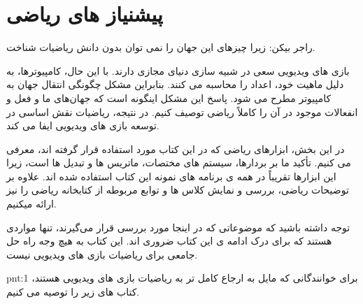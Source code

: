 \newpage

\part{پیشنیاز های ریاضی}
{
    \Large
    \begin{spacing}{1.4}
        \textbf{\vspace{3pt}}
        \begin{displayquote}
            راجر بیکن: زیرا چیزهای این جهان را نمی توان بدون دانش ریاضیات شناخت.
            \begin{flushleft}
            \end{flushleft}
        \end{displayquote}
        \textbf{\vspace{3pt}}

        بازی های ویدیویی سعی در شبیه سازی دنیای مجازی دارند.
        با این حال، کامپیوترها، به دلیل ماهیت خود، اعداد را محاسبه می کنند. بنابراین مشکل چگونگی انتقال جهان به کامپیوتر مطرح می شود.
        پاسخ این مشکل اینگونه است که جهان‌های ما و فعل و انفعالات موجود در آن را کاملاً ریاضی توصیف کنیم.
        در نتیجه، ریاضیات نقش اساسی در توسعه بازی های ویدیویی ایفا می کند.

        در این بخش، ابزارهای ریاضی که در این کتاب مورد استفاده قرار گرفته اند، معرفی می کنیم. تأکید ما بر بردارها، سیستم های مختصات، ماتریس ها و تبدیل ها است، زیرا این ابزارها تقریباً در همه ی برنامه های نمونه این کتاب استفاده شده اند.
        علاوه بر توضیحات ریاضی، بررسی و نمایش کلاس ها و توابع مربوطه از کتابخانه ریاضی  را نیز ارائه میکنیم.

        توجه داشته باشید که موضوعاتی که در اینجا مورد بررسی قرار می‌گیرند، تنها مواردی هستند که برای درک ادامه ی این کتاب ضروری اند.
        این کتاب به هیچ وجه راه حل جامعی برای ریاضیات بازی های ویدیویی نیست.

        \begin{point}{pnt:1}
            \Large
            برای خوانندگانی که مایل به ارجاع کامل تر به ریاضیات بازی های ویدیویی هستند، کتاب های زیر را توصیه می کنیم.
            \textbf{\vspace{-20pt}}
        \end{point}


\end{spacing}}
